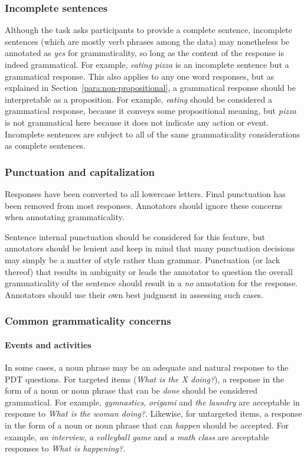 \documentclass[12pt]{article}
\begin{document}
\subsubsection{Incomplete sentences} \label{subsubsec:gram-incomplete-sentences} Although the task asks participants to provide a complete sentence, incomplete sentences (which are mostly verb phrases among the data) may nonetheless be annotated as \textit{yes} for grammaticality, so long as the content of the response is indeed grammatical. For example, \textit{eating pizza} is an incomplete sentence but a grammatical response. This also applies to any one word responses, but as explained in Section~\ref{para:non-propositional}, a grammatical response should be interpretable as a proposition. For example, \textit{eating} should be considered a grammatical response, because it conveys some propositional meaning, but \textit{pizza} is not grammatical here because it does not indicate any action or event. Incomplete sentences are subject to all of the same grammaticality considerations as complete sentences.

\subsubsection{Punctuation and capitalization} Responses have been converted to all lowercase letters. Final punctuation has been removed from most responses. Annotators should ignore these concerns when annotating grammaticality. 

Sentence internal punctuation should be considered for this feature, but annotators should be lenient and keep in mind that many punctuation decisions may simply be a matter of style rather than grammar. Punctuation (or lack thereof) that results in ambiguity or leads the annotator to question the overall grammaticality of the sentence should result in a \textit{no} annotation for the response. Annotators should use their own best judgment in assessing such cases.

\subsubsection{Common grammaticality concerns}

\paragraph{Events and activities}
\label{para:gram-events} In some cases, a noun phrase may be an adequate and natural response to the PDT questions. For targeted items (\textit{What is the X doing?}), a response in the form of a noun or noun phrase that can be \textit{done} should be considered grammatical. For example, \textit{gymnastics}, \textit{origami} and \textit{the laundry} are acceptable in response to \textit{What is the woman doing?}. Likewise, for untargeted items, a response in the form of a noun or noun phrase that can \textit{happen} should be accepted. For example, \textit{an interview}, \textit{a volleyball game} and \textit{a math class} are acceptable responses to \textit{What is happening?}.
\end{document}
